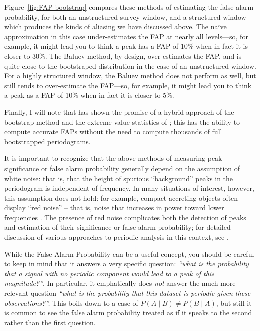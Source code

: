 \documentclass[preprint]{aastex}
\newcommand{\fig}[1]{Figure~\ref{fig:#1}}
\newcommand{\sectlabel}[1]{\label{sect:#1}}
\begin{document}
\fig{FAP-bootstrap} compares these methods of estimating the false alarm
probability, for both an unstructured survey window, and a structured window
which produces the kinds of aliasing we have discussed above.
The na{\"i}ve approximation in this case under-estimates the FAP at nearly all
levels---so, for example, it might lead you to think a peak has a FAP of 10\%
when in fact it is closer to 30\%.
The Baluev method, by design, over-estimates the FAP, and is quite close to
the bootstraped distribution in the case of an unstructured window.
For a highly structured window, the Baluev method does not perform as well,
but still tends to over-estimate the FAP---so, for example, it might lead you
to think a peak as a FAP of 10\% when in fact it is closer to 5\%.

Finally, I will note that \citet{Suveges12} has shown the promise of a
hybrid approach of the bootstrap method and the extreme value statistics
of \citet{Baluev2008}; this has the ability to compute accurate FAPs
without the need to compute thousands of full bootstrapped periodograms.

It is important to recognize that the above methods of measuring peak significance
or false alarm probability generally depend on the assumption of white noise:
that is, that the height of spurious ``background'' peaks in the periodogram
is independent of frequency.
In many situations of interest, however, this assumption does not hold: for
example, compact accreting objects often display ``red noise'' -- that is,
noise that increases in power toward lower frequencies \citep{Vaughan2003}.
The presence of red noise complicates both the detection of peaks and
estimation of their significance or false alarm probability; for detailed
discussion of various approaches to periodic analysis in this context,
see \citet{Vaughan2005, Vaughan2010}.

\sectlabel{what-FAP-measures}

While the False Alarm Probability can be a useful concept, you should be
careful to keep in mind that it answers a very specific question:
{\it ``what is the probability that a signal with no periodic component would
  lead to a peak of this magnitude?''}.
In particular, it emphatically does {\it not} answer the much more relevant
question {\it ``what is the probability that this dataset is periodic
  given these observations?''.}
This boils down to a case of $P(A \mid B) \ne P(B \mid A)$,
but still it is common to see the false alarm probability
treated as if it speaks to the second rather than the first question.
\end{document}

